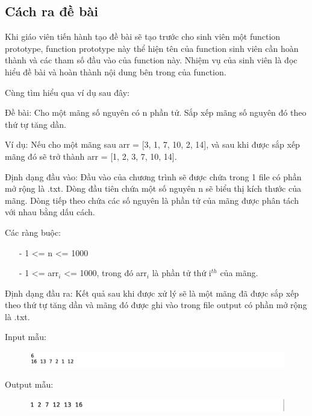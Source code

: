 \documentclass[12pt,a4paper]{article}
\begin{document}
\subsection{Cách ra đề bài}
Khi giáo viên tiến hành tạo đề bài sẽ tạo trước cho sinh viên một function prototype, function prototype này thể hiện tên của function sinh viên cần hoàn thành và các tham số đầu vào của function này. Nhiệm vụ của sinh viên là đọc hiểu đề bài và hoàn thành nội dung bên trong của function.

Cùng tìm hiểu qua ví dụ sau đây:

Đề bài: Cho một mãng số nguyên có n phần tử. Sắp xếp mãng số nguyên đó theo thứ tự tăng dần.

Ví dụ: Nếu cho một mãng sau arr = [3, 1, 7, 10, 2, 14], và sau khi được sắp xếp mãng đó sẽ trở thành arr = [1, 2, 3, 7, 10, 14].

Định dạng đầu vào: Đầu vào của chương trình sẽ được chứa trong 1 file có phần mở rộng là .txt. Dòng đầu tiên chứa một số nguyên n sẽ biểu thị kích thước của mãng. Dòng tiếp theo chứa các số nguyên là phần tử của mãng được phân tách với nhau bằng dấu cách.

Các ràng buộc:

\begin{itemize}
\item[-] 1 <= n <= 1000
\item[-] 1 <= arr$_{i}$  <= 1000, trong đó arr$_{i}$ là phần tử thứ i$^{th}$ của mãng.
\end{itemize}

Định dạng đầu ra: Kết quả sau khi được xử lý sẽ là một mãng đã được sắp xếp theo thứ tự tăng dần và mãng đó được ghi vào trong file output có phần mở rộng là .txt.

Input mẫu:

\begin{figure}[ht]
\begin{center}
\includegraphics[scale=.3]{hinhanh/inputsample.png}
\end{center}
\end{figure}

Output mẫu:

\begin{figure}[ht]
\begin{center}
\includegraphics[scale=0.4]{hinhanh/outputsample.png}
\end{center}
\end{figure}
\newpage
\end{document}
